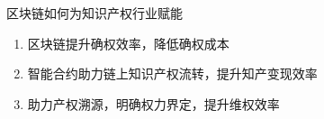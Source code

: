 \documentclass[11pt]{beamer}
\begin{document}
\begin{frame}{区块链如何为知识产权行业赋能}
	\begin{enumerate}
		\item 区块链提升确权效率，降低确权成本
		\item 智能合约助力链上知识产权流转，提升知产变现效率
		\item 助力产权溯源，明确权力界定，提升维权效率

\end{enumerate}
\end{frame}
\end{document}
